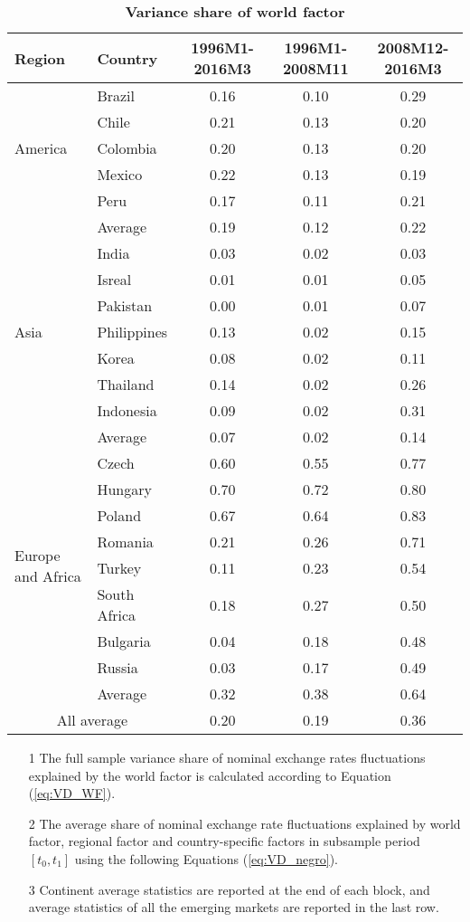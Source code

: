 \documentclass[12pt]{article}
\numberwithin{equation}{section}
\begin{document}
\begin{table}[htbp]
  \centering
  \caption{\textbf{Variance share of world factor}}
    \begin{tabularx}{\textwidth}{@{\extracolsep{\fill}}ll|ccc}
    \hline\hline
Region	&	Country	&	1996M1-2016M3	&	1996M1-2008M11	&	2008M12-2016M3	\\	\hline
\multirow{5}{*}{America}	&	Brazil	&	0.16 	&	0.10 	&	0.29 	\\	
	&	Chile	&	0.21 	&	0.13 	&	0.20 	\\	
	&	Colombia	&	0.20 	&	0.13 	&	0.20 	\\	
	&	Mexico	&	0.22 	&	0.13 	&	0.19 	\\	
	&	Peru	&	0.17 	&	0.11 	&	0.21 	\\	
	&	Average	&	0.19 	&	0.12 	&	0.22 	\\	\hline
\multirow{7}{*}{Asia}	&	India	&	0.03 	&	0.02 	&	0.03 	\\	
	&	Isreal	&	0.01 	&	0.01 	&	0.05 	\\	
	&	Pakistan	&	0.00 	&	0.01 	&	0.07 	\\	
	&	Philippines	&	0.13 	&	0.02 	&	0.15 	\\	
	&	Korea	&	0.08 	&	0.02 	&	0.11 	\\	
	&	Thailand	&	0.14 	&	0.02 	&	0.26 	\\	
	&	Indonesia	&	0.09 	&	0.02 	&	0.31 	\\	
	&	Average	&	0.07 	&	0.02 	&	0.14 	\\	\hline
\multirow{8}{*}{Europe and Africa}	&	Czech	&	0.60 	&	0.55 	&	0.77 	\\	
	&	Hungary	&	0.70 	&	0.72 	&	0.80 	\\	
	&	Poland	&	0.67 	&	0.64 	&	0.83 	\\	
	&	Romania	&	0.21 	&	0.26 	&	0.71 	\\	
	&	Turkey	&	0.11 	&	0.23 	&	0.54 	\\	
	&	South Africa	&	0.18 	&	0.27 	&	0.50 	\\	
	&	Bulgaria	&	0.04 	&	0.18 	&	0.48 	\\	
	&	Russia	&	0.03 	&	0.17 	&	0.49 	\\	
	&	Average	&	0.32 	&	0.38 	&	0.64 	\\	\hline
\multicolumn{2}{c|}{All average}			&	0.20 	&	0.19 	&	0.36 	\\	
   \hline\hline
    \end{tabularx}%

\begin{minipage}{\textwidth}
{			
    \begin{itemize}
\item[1] The full sample variance share of nominal exchange rates fluctuations explained by the world factor is calculated according to Equation (\ref{eq:VD_WF}).
\item[2] The average share of nominal exchange rate fluctuations explained by world factor, regional factor and country-specific factors in subsample period $[t_0,t_1]$ using the following Equations (\ref{eq:VD_negro}).
\item[3]  Continent average statistics are reported at the end of each block, and average statistics of all the emerging markets are reported in the last row.


\end{itemize}}
\end{minipage}
\end{table}
\end{document}
